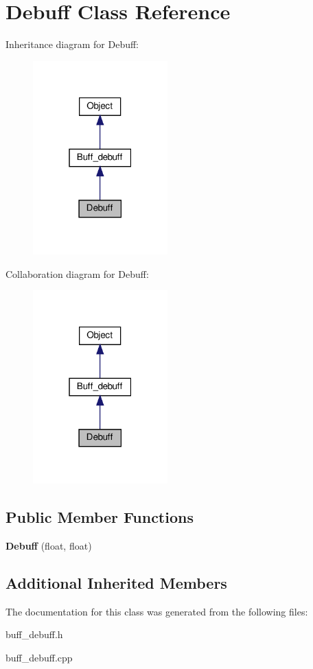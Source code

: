 \hypertarget{classDebuff}{}\section{Debuff Class Reference}
\label{classDebuff}


Inheritance diagram for Debuff\+:
\nopagebreak
\begin{figure}[H]
\begin{center}
\leavevmode
\includegraphics[width=147pt]{classDebuff__inherit__graph}
\end{center}
\end{figure}


Collaboration diagram for Debuff\+:
\nopagebreak
\begin{figure}[H]
\begin{center}
\leavevmode
\includegraphics[width=147pt]{classDebuff__coll__graph}
\end{center}
\end{figure}
\subsection*{Public Member Functions}
\begin{DoxyCompactItemize}
\item 
\mbox{\label{classDebuff_a8e830648566e6ece1e40355c1d8868f0}} 
{\bfseries Debuff} (float, float)
\end{DoxyCompactItemize}
\subsection*{Additional Inherited Members}


The documentation for this class was generated from the following files\+:\begin{DoxyCompactItemize}
\item 
buff\+\_\+debuff.\+h\item 
buff\+\_\+debuff.\+cpp\end{DoxyCompactItemize}
